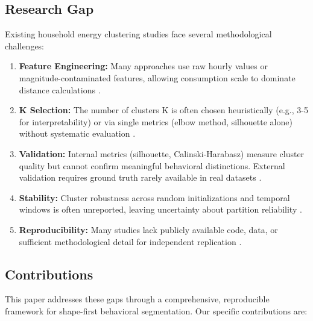 \documentclass[11pt,a4paper]{article}
\begin{document}
\subsection{Research Gap}

Existing household energy clustering studies face several methodological challenges:

\begin{enumerate}
    \item \textbf{Feature Engineering:} Many approaches use raw hourly values or magnitude-contaminated features, allowing consumption scale to dominate distance calculations \cite{kwac2014household,rhodes2014clustering}.
    
    \item \textbf{K Selection:} The number of clusters K is often chosen heuristically (e.g., 3-5 for interpretability) or via single metrics (elbow method, silhouette alone) without systematic evaluation \cite{hennig2020comparing}.
    
    \item \textbf{Validation:} Internal metrics (silhouette, Calinski-Harabasz) measure cluster quality but cannot confirm meaningful behavioral distinctions. External validation requires ground truth rarely available in real datasets \cite{gates2019adjusted}.
    
    \item \textbf{Stability:} Cluster robustness across random initializations and temporal windows is often unreported, leaving uncertainty about partition reliability \cite{henning2020adjusting}.
    
    \item \textbf{Reproducibility:} Many studies lack publicly available code, data, or sufficient methodological detail for independent replication \cite{peng2011reproducible}.
\end{enumerate}

\subsection{Contributions}

This paper addresses these gaps through a comprehensive, reproducible framework for shape-first behavioral segmentation. Our specific contributions are:
\end{document}

